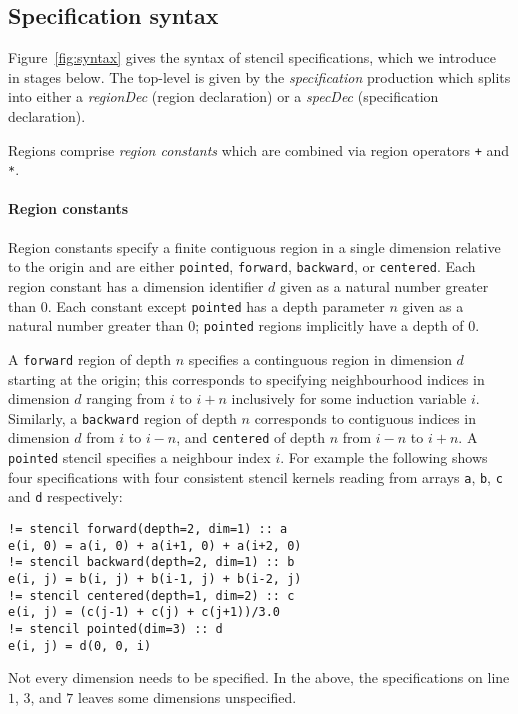 \documentclass[10pt,preprint]{sigplanconf}
\theoremstyle{definition}
\newcommand{\nonterm}[1]{\textit{#1}}
\newcommand{\term}[1]{\texttt{#1}}
\begin{document}
\subsection{Specification syntax}
\label{sec:syntax}

Figure~\ref{fig:syntax} gives the syntax of stencil specifications,
which we introduce in stages below.  The top-level is given by the
\nonterm{specification} production which splits into either a
\nonterm{regionDec} (region declaration) or a \nonterm{specDec}
(specification declaration).

Regions comprise \emph{region constants} which are
combined via region operators \term{+} and \term{*}.

\paragraph{Region constants}

Region constants specify a finite contiguous region in a
single dimension relative to the origin and are either \term{pointed},
\term{forward}, \term{backward}, or \term{centered}.  Each region
constant has a dimension identifier $d$ given as a natural number
greater than 0. Each constant except \term{pointed} has a depth
parameter $n$ given as a natural number greater than 0; \term{pointed}
regions implicitly have a depth of $0$.

A \term{forward} region of depth $n$ specifies a continguous
region in dimension $d$ starting at the origin; this corresponds
to specifying neighbourhood indices in dimension $d$ ranging from $i$ to $i + n$
inclusively for some induction variable $i$.  Similarly, a
\term{backward} region of depth $n$ corresponds to contiguous indices
in dimension $d$ from $i$ to $i - n$, and \term{centered}
of depth $n$ from $i - n$ to $i + n$. A \term{pointed}
stencil specifies a neighbour index $i$. For example the
following shows four specifications with four consistent stencil
kernels reading from arrays \term{a}, \term{b}, \term{c} and \term{d} respectively:
\begin{verbatim}
!= stencil forward(depth=2, dim=1) :: a
e(i, 0) = a(i, 0) + a(i+1, 0) + a(i+2, 0)
!= stencil backward(depth=2, dim=1) :: b
e(i, j) = b(i, j) + b(i-1, j) + b(i-2, j)
!= stencil centered(depth=1, dim=2) :: c
e(i, j) = (c(j-1) + c(j) + c(j+1))/3.0
!= stencil pointed(dim=3) :: d
e(i, j) = d(0, 0, i)
\end{verbatim}
Not every dimension needs to be specified. In the above, the
specifications on line $1$, $3$, and $7$ leaves some dimensions unspecified.
\end{document}
